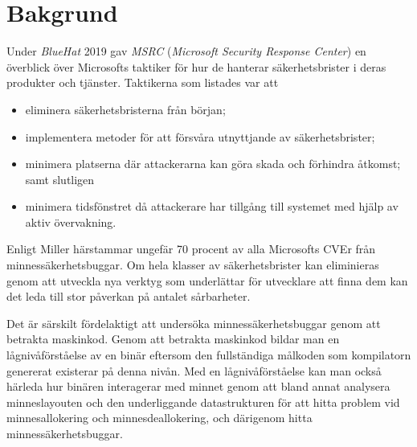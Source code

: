 \section{Bakgrund}
Under \emph{BlueHat} 2019 gav \emph{MSRC} (\emph{Microsoft Security Response Center}) en överblick
över Microsofts taktiker för hur de hanterar säkerhetsbrister i deras produkter och tjänster.
\cite{miller19} Taktikerna som listades var att
\begin{itemize}
	\item eliminera säkerhetsbristerna från början;
	\item implementera metoder för att försvåra utnyttjande av säkerhetsbrister;
	\item minimera platserna där attackerarna kan göra skada och förhindra åtkomst; samt slutligen
	\item minimera tidsfönstret då attackerare har tillgång till systemet med hjälp av aktiv övervakning.
\end{itemize}
Enligt Miller \cite{miller19} härstammar ungefär 70 procent av alla Microsofts CVEr från minnessäkerhetsbuggar. Om
hela klasser av säkerhetsbrister kan eliminieras genom att utveckla nya verktyg som underlättar för
utvecklare att finna dem kan det leda till stor påverkan på antalet sårbarheter.

Det är särskilt fördelaktigt att undersöka minnessäkerhetsbuggar genom att
betrakta maskinkod. Genom att betrakta maskinkod bildar man en lågnivåförståelse
av en binär eftersom den fullständiga målkoden som kompilatorn genererat
existerar på denna nivån. Med en lågnivåförståelse kan man också härleda hur
binären interagerar med minnet genom att bland annat analysera minneslayouten
och den underliggande datastrukturen för att hitta problem vid minnesallokering
och minnesdeallokering, och därigenom hitta minnessäkerhetsbuggar.

